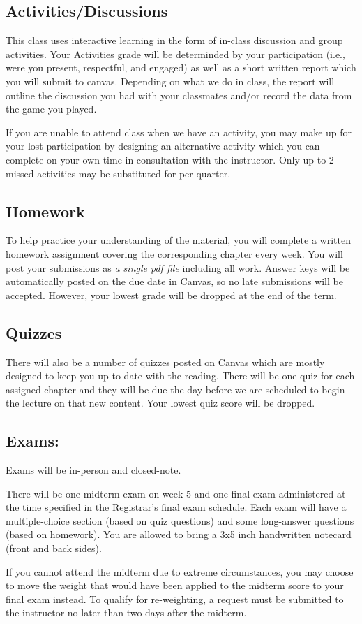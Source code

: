 \hypertarget{grade:activity}{\subsection{Activities/Discussions}}

This class uses interactive learning in the form of in-class discussion and group activities.
Your Activities grade will be determinded by your participation (i.e., were you present, respectful, and engaged)
as well as a short written report which you will submit to canvas.
Depending on what we do in class, the report will outline the discussion you had with your classmates
and/or record the data from the game you played.

If you are unable to attend class when we have an activity, you may make up for your lost participation by designing an alternative activity which you can complete on your own time in consultation with the instructor.
Only up to 2 missed activities may be substituted for per quarter.

\hypertarget{grade:HW}{\subsection{Homework}}

To help practice your understanding of the material, you will complete a written homework assignment covering the corresponding chapter every week.
You will post your submissions as \textit{a single pdf file} including all work.
Answer keys will be automatically posted on the due date in Canvas, so no late submissions will be accepted.
However, your lowest grade will be dropped at the end of the term.

\hypertarget{grade:quiz}{\subsection{Quizzes}}

There will also be a number of quizzes posted on Canvas which are mostly designed to keep you up to date with the reading.
There will be one quiz for each assigned chapter and they will be due the day before we are scheduled to begin the lecture on that new content.
Your lowest quiz score will be dropped.
 
\hypertarget{grade:exam}{\subsection{Exams:}}

Exams will be in-person and closed-note.

There will be one midterm exam on week 5 and one final exam administered at the time specified in the Registrar’s final exam schedule.
Each exam will have a multiple-choice section (based on quiz questions) and some long-answer questions (based on homework).
You are allowed to bring a 3x5 inch handwritten notecard (front and back sides).

If you cannot attend the midterm due to extreme circumstances, you may choose to move the weight that would have been applied to the midterm score to your final exam instead.
To qualify for re-weighting, a request must be submitted to the instructor no later than two days after the midterm.

